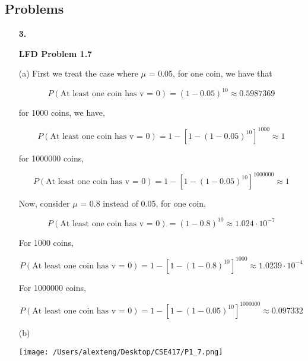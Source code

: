\documentclass[11pt]{article}
\begin{document}
\pagebreak

\subsection*{Problems}
\begin{enumerate}
\item[\textbf{3.}]

\textbf{LFD Problem 1.7}

(a) First we treat the case where $\mu$ = 0.05, for one coin, we have that 

$$P(\text{At least one coin has v = 0}) = (1-0.05)^{10} \approx 0.5987369$$

for 1000 coins, we have,

$$P(\text{At least one coin has v = 0}) = 1 - [1 - (1-0.05)^{10}]^{1000} \approx 1$$

for 1000000 coins, 

$$P(\text{At least one coin has v = 0}) = 1 - [1 - (1 - 0.05)^{10}]^{1000000} \approx 1$$

Now, consider $\mu$ = 0.8 instead of 0.05, for one coin,

$$P(\text{At least one coin has v = 0}) = (1 - 0.8)^{10} \approx 1.024 \cdot 10^{-7}$$

For  1000 coins, 

$$P(\text{At least one coin has v = 0}) = 1 - [1 - (1-0.8)^{10}]^{1000} \approx 1.0239 \cdot 10^{-4}$$

For 1000000 coins,

$$P(\text{At least one coin has v = 0}) = 1 - [1 - (1 - 0.05)^{10}]^{1000000} \approx 0.097332$$

(b)

\texttt{[image: /Users/alexteng/Desktop/CSE417/P1\_7.png]}



\end{enumerate}

\pagebreak
\end{document}
